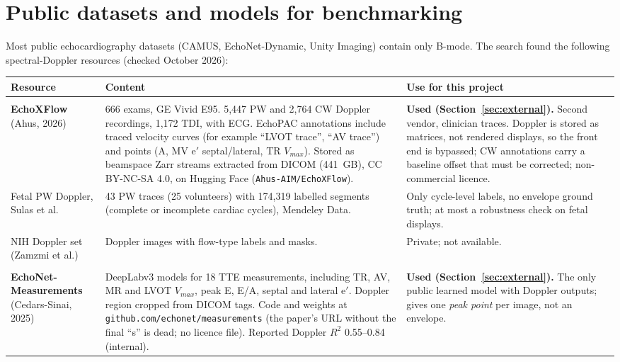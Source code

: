 \documentclass[10pt,a4paper]{article}
\newcommand{\code}[1]{\texttt{\small #1}}
\begin{document}
\section{Public datasets and models for benchmarking}
\label{sec:public}
Most public echocardiography datasets (CAMUS, EchoNet-Dynamic, Unity Imaging) contain only B-mode. The search found the following
spectral-Doppler resources (checked October 2026):

\begin{center}\footnotesize
\setlength{\tabcolsep}{4pt}
\begin{tabularx}{\linewidth}{@{}>{\raggedright\arraybackslash}p{2.9cm}LL@{}}
\toprule
Resource & Content & Use for this project \\ \midrule
{} \\
\textbf{EchoXFlow} \cite{echoxflow} (Ahus, 2026) & 666 exams, GE Vivid E95. 5,447 PW and 2,764 CW Doppler recordings, 1,172 TDI, with ECG.
EchoPAC annotations include traced velocity curves (for example ``LVOT trace'', ``AV trace'') and points (A, MV e$'$ septal/lateral, TR $V_{max}$).
Stored as beamspace Zarr streams extracted from DICOM (441~GB), CC BY-NC-SA 4.0, on Hugging Face (\code{Ahus-AIM/EchoXFlow}). &
\textbf{Used (Section~\ref{sec:external}).} Second vendor, clinician traces. Doppler is stored as matrices, not rendered displays,
so the front end is bypassed; CW annotations carry a baseline offset that must be corrected; non-commercial licence. \\
Fetal PW Doppler, Sulas et al.\ \cite{sulas} & 43 PW traces (25 volunteers) with 174,319 labelled segments (complete or incomplete cardiac cycles), Mendeley Data. &
Only cycle-level labels, no envelope ground truth; at most a robustness check on fetal displays. \\
NIH Doppler set (Zamzmi et al.) \cite{zamzmi} & Doppler images with flow-type labels and masks. & Private; not available. \\
\midrule
{} \\
\textbf{EchoNet-Measurements} \cite{echonetmeas} (Cedars-Sinai, 2025) & DeepLabv3 models for 18 TTE measurements, including TR, AV, MR and LVOT
$V_{max}$, peak E, E/A, septal and lateral e$'$. Doppler region cropped from DICOM tags. Code and weights at \code{github.com/echonet/measurements}
(the paper's URL without the final ``s'' is dead; no licence file). Reported Doppler $R^2$ 0.55--0.84 (internal). &
\textbf{Used (Section~\ref{sec:external}).} The only public learned model with Doppler outputs; gives one \emph{peak point} per image, not an envelope. \\

\end{tabularx}
\end{center}
\end{document}
